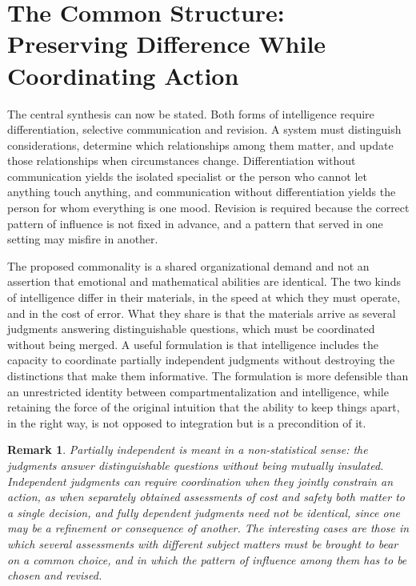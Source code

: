 \documentclass[12pt, a4paper]{article}
\newtheorem{remark}{Remark}
\begin{document}
\section{The Common Structure: Preserving Difference While Coordinating Action}

The central synthesis can now be stated. Both forms of intelligence require differentiation, selective communication and revision. A system must distinguish considerations, determine which relationships among them matter, and update those relationships when circumstances change. Differentiation without communication yields the isolated specialist or the person who cannot let anything touch anything, and communication without differentiation yields the person for whom everything is one mood. Revision is required because the correct pattern of influence is not fixed in advance, and a pattern that served in one setting may misfire in another.

The proposed commonality is a shared organizational demand and not an assertion that emotional and mathematical abilities are identical. The two kinds of intelligence differ in their materials, in the speed at which they must operate, and in the cost of error. What they share is that the materials arrive as several judgments answering distinguishable questions, which must be coordinated without being merged. A useful formulation is that intelligence includes the capacity to coordinate partially independent judgments without destroying the distinctions that make them informative. The formulation is more defensible than an unrestricted identity between compartmentalization and intelligence, while retaining the force of the original intuition that the ability to keep things apart, in the right way, is not opposed to integration but is a precondition of it.

\begin{remark}
\emph{Partially independent} is meant in a non-statistical sense: the judgments answer distinguishable questions without being mutually insulated. Independent judgments can require coordination when they jointly constrain an action, as when separately obtained assessments of cost and safety both matter to a single decision, and fully dependent judgments need not be identical, since one may be a refinement or consequence of another. The interesting cases are those in which several assessments with different subject matters must be brought to bear on a common choice, and in which the pattern of influence among them has to be chosen and revised.
\end{remark}
\end{document}
